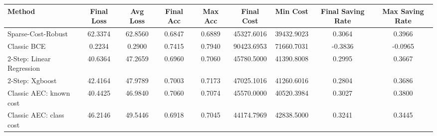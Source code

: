 \begin{tabular}{lcccccccc}
\toprule
Method & Final Loss & Avg Loss & Final Acc & Max Acc & Final Cost & Min Cost & Final Saving Rate & Max Saving Rate \\
\midrule
Sparse-Cost-Robust & 62.3374 & 62.8560 & 0.6847 & 0.6889 & 45327.6016 & 39432.9023 & 0.3064 & 0.3966 \\
Classic BCE & 0.2234 & 0.2900 & 0.7415 & 0.7940 & 90423.6953 & 71660.7031 & -0.3836 & -0.0965 \\
2-Step: Linear Regression & 40.6364 & 47.2659 & 0.6960 & 0.7060 & 45780.5000 & 41390.8008 & 0.2995 & 0.3667 \\
2-Step: Xgboost & 42.4164 & 47.9789 & 0.7003 & 0.7173 & 47025.1016 & 41260.6016 & 0.2804 & 0.3686 \\
Classic AEC: known cost & 40.4425 & 46.9840 & 0.7060 & 0.7074 & 45570.0000 & 40520.3984 & 0.3027 & 0.3800 \\
Classic AEC: class cost & 46.2146 & 49.5446 & 0.6918 & 0.7045 & 44174.7969 & 42838.5000 & 0.3241 & 0.3445 \\
\bottomrule
\end{tabular}
